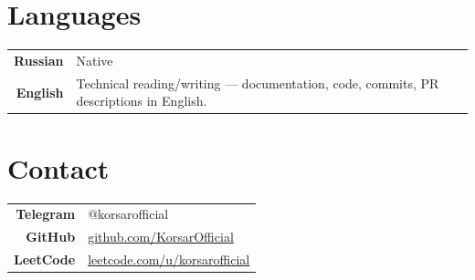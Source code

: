\documentclass[10pt, a4paper]{article}
\begin{document}
\vspace{-2pt}

\section{Languages}

\begin{tabularx}{\textwidth}{@{}r|X@{}}
\textbf{\small Russian} & Native \\
\textbf{\small English} & Technical reading/writing --- documentation, code, commits, PR descriptions in English. \\
\end{tabularx}

\vspace{-2pt}

\section{Contact}

\begin{tabularx}{\textwidth}{@{}r|X@{}}
\textbf{\small Telegram} & @korsarofficial \\
\textbf{\small GitHub} & \href{https://github.com/KorsarOfficial}{github.com/KorsarOfficial} \\
\textbf{\small LeetCode} & \href{https://leetcode.com/u/korsarofficial}{leetcode.com/u/korsarofficial} \\
\end{tabularx}
\end{document}
